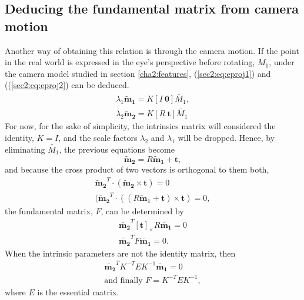 \subsection{Deducing the fundamental matrix from camera motion}
Another way of obtaining this relation is through the camera motion.
If the point in the real world is expressed in the eye's perspective before rotating, $M_1$, under the camera model studied in section \ref{cha2:features}, (\ref{sec2:eq:eproj1}) and ((\ref{sec2:eq:eproj2}) can be deduced.
\begin{align}
\label{sec2:eq:eproj1}
\lambda_1 \mathbf{\tilde{m}_1} = K [ I \ \mathbf{0} ] \tilde{M_1}, \\
\label{sec2:eq:eproj2}
\lambda_2 \mathbf{\tilde{m}_2} = K [ R \ \mathbf{t} ] \tilde{M_1}
\end{align}
For now, for the sake of simplicity, the intrinsics matrix will considered the identity, $K= I$, and the scale factors $\lambda_2$ and $\lambda_1$ will be dropped. Hence, by eliminating $\tilde{M_1}$, the previous equations become
\begin{equation}
\label{sec2:eq:elimp}
\mathbf{\tilde{m}_2} = R   \mathbf{\tilde{m}_1} + \mathbf{t},
\end{equation}
and because the cross product of two vectors is orthogonal to them both,  
\begin{align}
	\label{sec2:eq:fundm1}
	\mathbf{\tilde{m}_2}^T \cdot ( \mathbf{\tilde{m}_2} \times \mathbf{t}) = 0 \\
	\label{sec2:eq:fundm2}
	( \mathbf{\tilde{m}_2}^T\cdot((R  \mathbf{\tilde{m}_1} + \mathbf{t}) \times \mathbf{t}) = 0,
\end{align}
the fundamental matrix, $F$, can be determined by 
\begin{equation}
\label{sec2:eq:fundm3}
\begin{aligned}
\mathbf{\tilde{m_2}}^T [\mathbf{t}]_\times R \mathbf{\tilde{m_1}} = 0 \\
\mathbf{\tilde{m_2}}^T F \mathbf{\tilde{m_1}} = 0.
\end{aligned}
\end{equation}
When the intrinsic parameters are not the identity matrix, then 
\begin{equation}
\begin{aligned}
\label{hhh}
\mathbf{\tilde{m_2}}^T K^{-T} E K^{-1} \mathbf{\tilde{m_1}} = 0 \\
\text{and finally }
F = K^{-T}  E K^{-1},
\end{aligned}
\end{equation}
where $E$ is the essential matrix.

